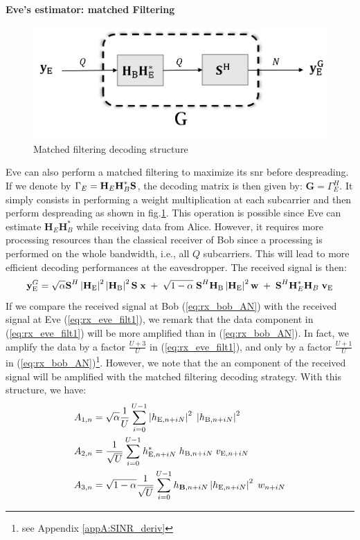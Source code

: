 \paragraph{Eve's estimator: matched Filtering}
\begin{figure}[htb!]
    \centering
    \includegraphics[width=.5\linewidth]{img/matched_filter.png}
    \caption{Matched filtering decoding structure}
    \label{fig:matched_filter}
\end{figure}
Eve can also perform a matched filtering to maximize its \gls{snr} before despreading. If we denote by $\Gamma_E = \textbf{H}_E \textbf{H}_B^* \textbf{S}$, the decoding matrix is then given by: $\textbf{G}=\Gamma_E^H$. It simply consists in performing a weight multiplication at each subcarrier and then perform despreading as shown in fig.\ref{fig:matched_filter}. This operation is possible since Eve can estimate $\textbf{H}_E \textbf{H}_B^*$ while receiving data from Alice. However, it requires more processing resources than the classical receiver of Bob since a processing is performed on the whole bandwidth, i.e., all $Q$ subcarriers. This will lead to more efficient decoding performances at the eavesdropper. The received signal is then:
\begin{equation}
    \textbf{y}_{\text{E}}^G = \sqrt{\alpha} \textbf{S}^H \left|\textbf{H}_{\text{E}}\right|^2 \left|\textbf{H}_{\text{B}}\right|^2 \textbf{S}\; \textbf{x} \; +  \; \sqrt{1-\alpha} \; \textbf{S}^H \textbf{H}_{\text{B}}\left|\textbf{H}_{\text{E}}\right|^2 \textbf{w}  \; +  \; \textbf{S}^H  \textbf{H}^*_E \textbf{H}_B \;\textbf{v}_{\text{E}}
    \label{eq:rx_eve_filt1}
\end{equation}
If we compare the received signal at Bob (\ref{eq:rx_bob_AN}) with the received signal at Eve (\ref{eq:rx_eve_filt1}), we remark that the data component in (\ref{eq:rx_eve_filt1}) will be more amplified than in (\ref{eq:rx_bob_AN}). In fact, we amplify the data by a factor $\frac{U+3}{U}$ in (\ref{eq:rx_eve_filt1}), and only by a factor $\frac{U+1}{U}$ in (\ref{eq:rx_bob_AN})\footnote{see Appendix \ref{appA:SINR_deriv}}. However, we note that the \gls{an} component of the received signal will be amplified with the matched filtering decoding strategy. With this structure, we have:
\begin{equation}
    \begin{split}
        A_{1,n} &= \sqrt{\alpha}\frac{1}{U}\sum_{i=0}^{U-1}  \left|h_{\text{E}, n + iN}\right|^2 \; \left|h_{\text{B}, n + iN}\right|^2 \\
        A_{2,n} &= \frac{1}{\sqrt{U}}\sum_{i=0}^{U-1} h^*_{\text{E}, n + iN} \; h_{\text{B}, n + iN} \; v_{\text{E}, n + iN}\\
        A_{3,n} &= \sqrt{1-\alpha}\frac{1}{\sqrt{U}}\sum_{i=0}^{U-1}    h_{\text{\textbf{B}}, n + iN} \left|h_{\text{E}, n + iN}\right|^2\; w_{n + iN}
    \end{split}
\end{equation}
